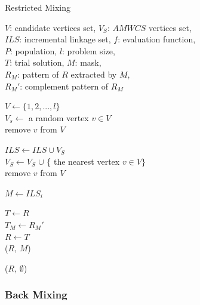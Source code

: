 \documentclass{sig-alternate-05-2015}
\begin{document}
\begin{algorithm}
\caption{Restricted Mixing}\label{algo_disjdecomp}

$V$: candidate vertices set, $V_S$: $AMWCS$ vertices set,  \\
$ILS$: incremental linkage set, $f$: evaluation function, \\
$P$: population, $l$: problem size, \\
$T$: trial solution, $M$: mask, \\
${R_M}$: pattern of $R$ extracted by $M$, \\
${R_M}'$: complement pattern of ${R_M}$


\BlankLine
$V \leftarrow \{ 1, 2, ..., l \}$ \\
$V_s \leftarrow$ a random vertex $v \in V$ \\
remove $v$ from $V$ \\

 {

    $ILS \leftarrow ILS \cup V_{S}$ \\
    $V_S \leftarrow V_S$ $\cup$ \{ the nearest vertex $v \in V \}$ \\
    
    remove $v$ from $V$ \\
}

\BlankLine
{} {

    $M \leftarrow ILS_i$ \\

     {

        $T \leftarrow R$ \\
        $T_M \leftarrow {R_M}'$ \\

         {
            $R \leftarrow T$ \\
            \Return ($R$, $M$)
        }
    }
}
\Return ($R$, $\emptyset$) 
\end{algorithm}


\subsubsection{Back Mixing}
\end{document}
